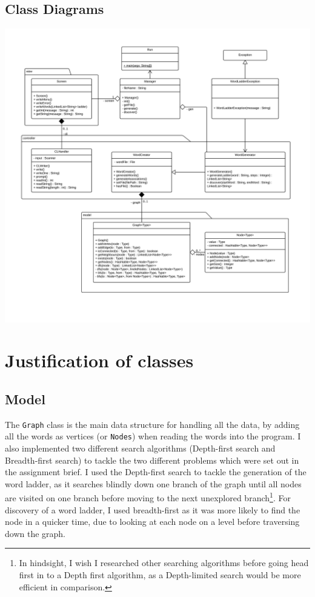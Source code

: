 \documentclass[10pt, a4paper]{article}
\begin{document}
\subsection{Class Diagrams}
\hspace*{-1.5in}
\includegraphics[width=1.66\textwidth,height=1.66\textheight,keepaspectratio]{./images/classdiagram.png}

\section{Justification of classes}

\subsection{Model}

The \texttt{Graph} class is the main data structure for handling all the data, by adding all the words as vertices (or \texttt{Nodes}) when reading the words into the program. I also implemented two different search algorithms (Depth-first search and Breadth-first search) to tackle the two different problems which were set out in the assignment brief. I used the Depth-first search to tackle the generation of the word ladder, as it searches blindly down one branch of the graph until all nodes are visited on one branch before moving to the next unexplored branch\footnote{In hindsight, I wish I researched other searching algorithms before going head first in to a Depth first algorithm, as a Depth-limited search would be more efficient in comparison.}. For discovery of a word ladder, I used breadth-first as it was more likely to find the node in a quicker time, due to looking at each node on a level before traversing down the graph. 
\end{document}
